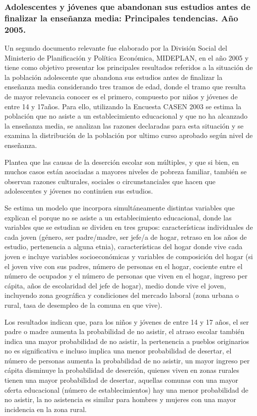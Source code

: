 \subsubsection{Adolescentes y jóvenes que abandonan sus estudios antes de finalizar la enseñanza media: Principales tendencias. Año 2005.} 
Un segundo documento relevante fue elaborado por la División Social del Ministerio de Planificación y Política Económica, MIDEPLAN, en el año 2005 y tiene como objetivo presentar los principales resultados referidos a la situación de la población adolescente que abandona sus estudios antes de finalizar la enseñanza media considerando tres tramos de edad, donde el tramo que resulta de mayor relevancia conocer es el primero, compuesto por niños y jóvenes de entre 14 y 17años. Para ello, utilizando la Encuesta CASEN 2003 se estima la población que no asiste a un establecimiento educacional y que no ha alcanzado la enseñanza media, se analizan las razones declaradas para esta situación y se examina  la distribución de la población por ultimo curso aprobado según nivel de enseñanza. 

Plantea que las causas de la deserción escolar son múltiples, y que si bien, en muchos casos están asociadas a mayores niveles de pobreza familiar, también se observan razones culturales, sociales o circunstanciales que hacen que adolescentes y jóvenes no continúen sus estudios.

Se estima un modelo que incorpora simultáneamente distintas variables que explican el porque no se asiste a un establecimiento educacional, donde las variables que se estudian se dividen en tres grupos: características individuales de cada joven (género, ser padre/madre, ser jefe/a de hogar, retraso en los años de estudio, pertenencia a alguna etnia), características del hogar donde vive cada joven e incluye variables socioeconómicas y variables de composición del hogar (si el joven vive con sus padres, número de personas en el hogar, cociente entre el número de ocupados y el número de personas que viven en el hogar, ingreso per cápita, años de escolaridad del jefe de hogar), medio donde vive el joven, incluyendo zona geográfica y condiciones del mercado laboral (zona urbana o rural, tasa de desempleo de la comuna en que vive).

Los resultados indican que, para los niños y jóvenes de entre 14 y 17 años,  el ser padre o madre aumenta la probabilidad de no asistir, el atraso escolar también indica una mayor probabilidad de no asistir, la pertenencia a pueblos originarios no es significativa e incluso implica una menor probabilidad de desertar, el número de personas aumenta la probabilidad de no asistir, un mayor ingreso per cápita disminuye la probabilidad de deserción, quienes viven en zonas rurales tienen una mayor probabilidad de desertar, aquellas comunas con una mayor oferta educacional (número de establecimientos) hay una menor probabilidad de no asistir, la no asistencia es similar para hombres y mujeres con una mayor incidencia en la zona rural.

